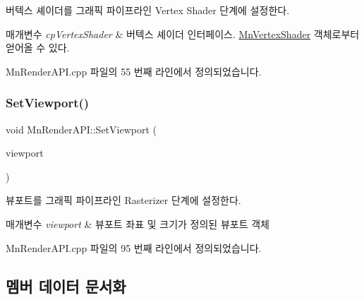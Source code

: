 버텍스 셰이더를 그래픽 파이프라인 Vertex Shader 단계에 설정한다. 


\begin{DoxyParams}{매개변수}
{\em cp\+Vertex\+Shader} & 버텍스 셰이더 인터페이스. \hyperlink{class_m_n_l_1_1_mn_vertex_shader}{Mn\+Vertex\+Shader} 객체로부터 얻어올 수 있다. \\
\hline
\end{DoxyParams}


Mn\+Render\+A\+P\+I.\+cpp 파일의 55 번째 라인에서 정의되었습니다.

\mbox{\label{class_m_n_l_1_1_mn_render_a_p_i_aec7697c401d411b4fc83268b4d98d9c3}} 
\subsubsection{\texorpdfstring{Set\+Viewport()}{SetViewport()}}
{\footnotesize\ttfamily void Mn\+Render\+A\+P\+I\+::\+Set\+Viewport (\begin{DoxyParamCaption}\item[{const D3\+D11\+\_\+\+V\+I\+E\+W\+P\+O\+RT \&}]{viewport }\end{DoxyParamCaption})}



뷰포트를 그래픽 파이프라인 Rasterizer 단계에 설정한다. 


\begin{DoxyParams}{매개변수}
{\em viewport} & 뷰포트 좌표 및 크기가 정의된 뷰포트 객체 \\
\hline
\end{DoxyParams}


Mn\+Render\+A\+P\+I.\+cpp 파일의 95 번째 라인에서 정의되었습니다.



\subsection{멤버 데이터 문서화}
\mbox{\label{class_m_n_l_1_1_mn_render_a_p_i_ac276c60417e41b5cfdb7471da6a6bcdb}} 
